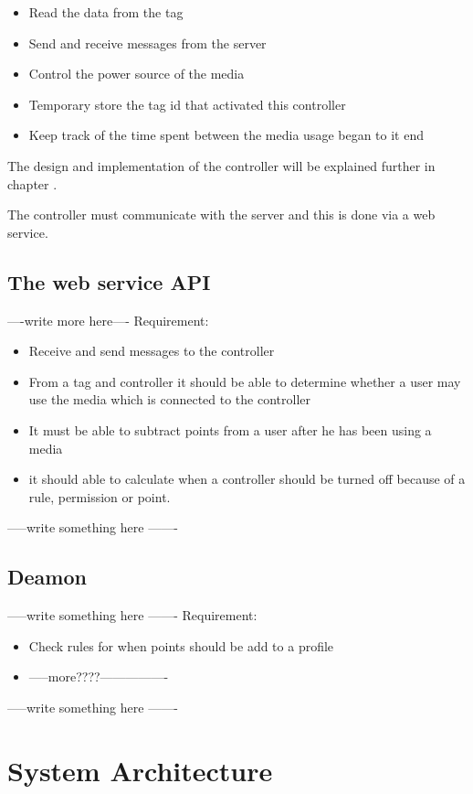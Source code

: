 \begin{itemize}
	\item Read the data from the tag
	\item Send and receive messages from the server
	\item Control the power source of the media 
	\item Temporary store the tag id that activated this controller
	\item Keep track of the time spent between the media usage began to it end
\end{itemize}
 
The design and implementation of the controller will be explained further in chapter . 

The controller must communicate with the server and this is done via a web service.

\subsection{The web service API}

----write more here----
Requirement:
\begin{itemize}
	\item Receive and send messages to the controller
	\item From a tag and controller it should be able to determine whether a user may use the media which is connected to the controller
	\item It must be able to subtract points from a user after he has been using a media
	\item it should able to calculate when a controller should be turned off because of a rule, permission or point.
\end{itemize}

-----write something here -------


\subsection{Deamon}
\label{subsec:deamon}
-----write something here -------
Requirement:
\begin{itemize}
	\item Check rules for when points should be add to a profile
	\item -----more????----------------
\end{itemize}
-----write something here -------


\section{System Architecture}
\label{sec:sysArchitecture}

